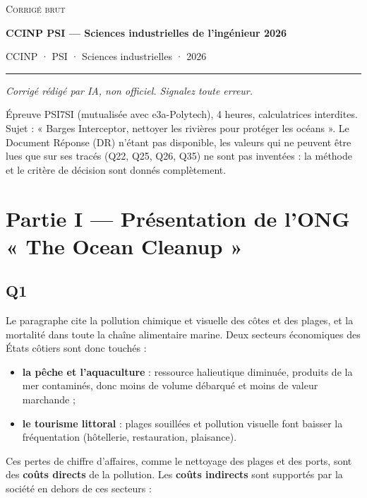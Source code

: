 \documentclass[11pt,a4paper]{article}
\providecommand{\tightlist}{\setlength{\itemsep}{0pt}\setlength{\parskip}{0pt}}
\begin{document}
\thispagestyle{plain}
\begin{center}
  {\small\scshape Corrigé brut}\par\smallskip
  {\LARGE\bfseries CCINP PSI — Sciences industrielles de l'ingénieur 2026\par}\medskip
  {\large CCINP · PSI · Sciences industrielles · 2026\par}
\end{center}
\vspace{2pt}\hrule\vspace{8pt}

\emph{Corrigé rédigé par IA, non officiel. Signalez toute erreur.}

Épreuve PSI7SI (mutualisée avec e3a-Polytech), 4 heures, calculatrices interdites. Sujet : « Barges Interceptor, nettoyer les rivières pour protéger les océans ». Le Document Réponse (DR) n'étant pas disponible, les valeurs qui ne peuvent être lues que sur ses tracés (Q22, Q25, Q26, Q35) ne sont pas inventées : la méthode et le critère de décision sont donnés complètement.

\hypertarget{partie-i-pruxe9sentation-de-long-the-ocean-cleanup}{%
\section{Partie I --- Présentation de l'ONG « The Ocean Cleanup »}\label{partie-i-pruxe9sentation-de-long-the-ocean-cleanup}}

\hypertarget{q1}{%
\subsection{Q1}\label{q1}}

Le paragraphe cite la pollution chimique et visuelle des côtes et des plages, et la mortalité dans toute la chaîne alimentaire marine. Deux secteurs économiques des États côtiers sont donc touchés :

\begin{itemize}
\tightlist
\item
  \textbf{la pêche et l'aquaculture} : ressource halieutique diminuée, produits de la mer contaminés, donc moins de volume débarqué et moins de valeur marchande ;
\item
  \textbf{le tourisme littoral} : plages souillées et pollution visuelle font baisser la fréquentation (hôtellerie, restauration, plaisance).
\end{itemize}

Ces pertes de chiffre d'affaires, comme le nettoyage des plages et des ports, sont des \textbf{coûts directs} de la pollution. Les \textbf{coûts indirects} sont supportés par la société en dehors de ces secteurs :
\end{document}
